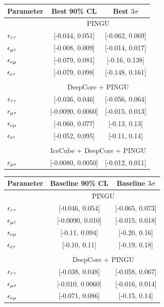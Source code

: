 {{\begin{table}
   \centering
   \begin{tabular}{lcc}
      \hline
      Parameter & Best 90\% CL & Best $3\sigma$\\
      \hline & \multicolumn{2}{c}{PINGU} \\
      $\epsilon_{\tau\tau}$ &  [-0.044, 0.051] &  [-0.062, 0.069] \\
      $\epsilon_{\mu\tau}$ &  [-0.008, 0.009] &  [-0.014, 0.017] \\
      $\epsilon_{e\mu}$ &  [-0.079, 0.081] &   [-0.16, 0.138] \\
      $\epsilon_{e\tau}$ &  [-0.079, 0.098] &  [-0.148, 0.161] \\\\
      & \multicolumn{2}{c}{DeepCore + PINGU} \\
      $\epsilon_{\tau\tau}$ &  [-0.036, 0.046] &  [-0.056, 0.064] \\
      $\epsilon_{\mu\tau}$ &  [-0.0090, 0.0060] &  [-0.015, 0.013] \\
      $\epsilon_{e\mu}$ &   [-0.060, 0.077] &  [-0.13, 0.13] \\
      $\epsilon_{e\tau}$ &  [-0.052, 0.095] &  [-0.11, 0.14] \\\\
      & \multicolumn{2}{c}{IceCube + DeepCore + PINGU}  \\
      $\epsilon_{\mu\tau}$ &  [-0.0080, 0.0050] &  [-0.012, 0.011] \\
      \hline
   \end{tabular}
   \begin{tabular}{lcc}
      \hline 
      Parameter & Baseline 90\% CL & Baseline $3\sigma$\\
      \hline & \multicolumn{2}{c}{PINGU} \\
      $\epsilon_{\tau\tau}$ &  [-0.046, 0.054] &  [-0.065, 0.073] \\
      $\epsilon_{\mu\tau}$ &   [-0.0090, 0.010] &  [-0.015, 0.018] \\
      $\epsilon_{e\mu}$ &  [-0.11, 0.094] &  [-0.20, 0.16] \\
      $\epsilon_{e\tau}$ &   [-0.10, 0.11] &  [-0.19, 0.18] \\\\
      & \multicolumn{2}{c}{DeepCore + PINGU} \\
      $\epsilon_{\tau\tau}$ &    [-0.038, 0.048] &  [-0.058, 0.067] \\
      $\epsilon_{\mu\tau}$ &    [-0.010, 0.0060] &  [-0.016, 0.014] \\
      $\epsilon_{e\mu}$ &    [-0.071, 0.086] &  [-0.15, 0.14]  \\

\end{tabular}
\end{table}}}
